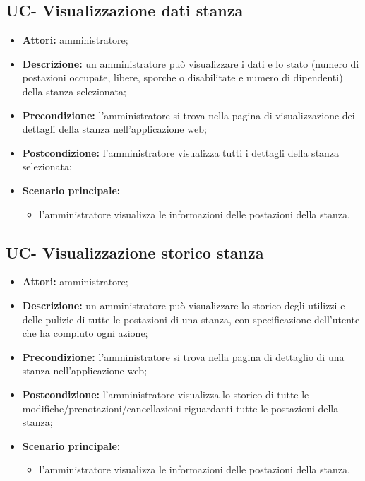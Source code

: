 \subsection{UC- Visualizzazione dati stanza}
\begin{itemize}
    \item \textbf{Attori:} amministratore;
    \item \textbf{Descrizione:} un amministratore pu\`{o} visualizzare i dati e lo stato (numero di postazioni occupate, libere, sporche o disabilitate e numero di dipendenti) della stanza selezionata;
    \item \textbf{Precondizione:} l'amministratore si trova nella pagina di visualizzazione dei dettagli della stanza nell'applicazione web;
    \item \textbf{Postcondizione:} l'amministratore visualizza tutti i dettagli della stanza selezionata;
    \item \textbf{Scenario principale:}
    \begin{itemize}
        \item l'amministratore visualizza le informazioni delle postazioni della stanza.
    \end{itemize}
\end{itemize}


\subsection{UC- Visualizzazione storico stanza}
\begin{itemize}
    \item \textbf{Attori:} amministratore;
    \item \textbf{Descrizione:} un amministratore pu\`{o} visualizzare lo storico degli utilizzi e delle pulizie di tutte le postazioni di una stanza, con specificazione dell'utente che ha compiuto ogni azione;
    \item \textbf{Precondizione:} l'amministratore si trova nella pagina di dettaglio di una stanza nell'applicazione web;
    \item \textbf{Postcondizione:} l'amministratore visualizza lo storico di tutte le modifiche/prenotazioni/cancellazioni riguardanti tutte le postazioni della stanza;
    \item \textbf{Scenario principale:}
    \begin{itemize}
        \item l'amministratore visualizza le informazioni delle postazioni della stanza.
    \end{itemize}
\end{itemize}


